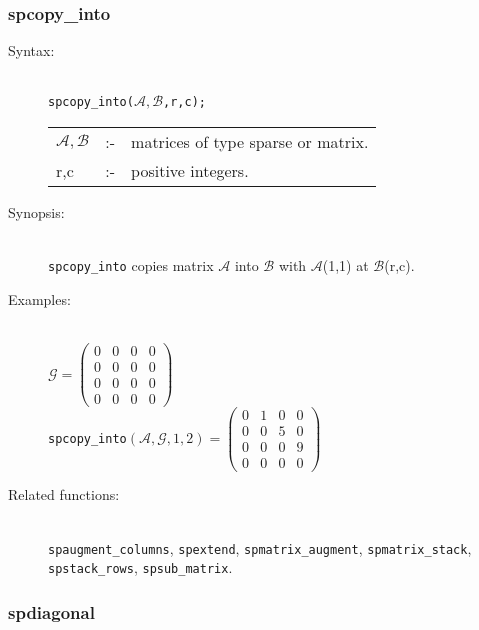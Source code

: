 \subsubsection{spcopy\_into}
\label{sparse:spcopy_into}
\hypertarget{operator:SPCOPY_INTO}{}

\begin{description}
\item[Syntax:]\mbox{}\\
\texttt{spcopy\_into($\mathcal{A,B}$,r,c);}\\[2mm]
\begin{tabular}{l l l}
$\mathcal{A,B}$ &:-& matrices of type sparse or matrix. \\
r,c          &:-& positive integers.
\end{tabular}

\item[Synopsis:]\mbox{}\\
 \texttt{spcopy\_into} copies matrix $\mathcal{A}$ into
                $\mathcal{B}$ with $\mathcal{A}$(1,1) at $\mathcal{B}$(r,c).

\item[Examples:]\mbox{}\\
\(\mathcal{G} = \begin{pmatrix} 0 & 0 & 0 & 0 \\ 0 & 0 & 0 & 0 \\
0 & 0 & 0 & 0 \\ 0 & 0 & 0 & 0
\end{pmatrix}\) \\[2mm]
\texttt{spcopy\_into}\((\mathcal{A,G},1,2)  =
\begin{pmatrix} 0 & 1 & 0 & 0 \\ 0 & 0 & 5 & 0 \\ 0 & 0 & 0
& 9 \\ 0 & 0 & 0 & 0
\end{pmatrix}\)

\item[Related functions:]\mbox{}\\
\texttt{spaugment\_columns}, \texttt{spextend}, \texttt{spmatrix\_augment},
\texttt{spmatrix\_stack}, \texttt{spstack\_rows}, \texttt{spsub\_matrix}.
\end{description}


\subsubsection{spdiagonal}
\label{sparse:spdiagonal}
\hypertarget{operator:SPDIAGONAL}{}

